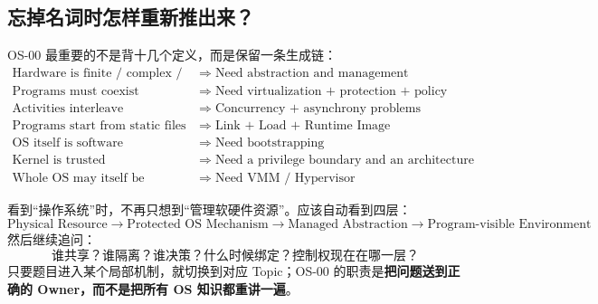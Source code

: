 \documentclass[11pt,a4paper]{ctexart}
\newcommand{\kw}[1]{\textbf{#1}}
\begin{document}
\subsection{忘掉名词时怎样重新推出来？}

OS-00 最重要的不是背十几个定义，而是保留一条生成链：
\[
\boxed{
\begin{aligned}
\text{Hardware is finite / complex / shared}\;&\Rightarrow\;\text{Need abstraction and management}\\
\text{Programs must coexist}\;&\Rightarrow\;\text{Need virtualization + protection + policy}\\
\text{Activities interleave}\;&\Rightarrow\;\text{Concurrency + asynchrony problems}\\
\text{Programs start from static files}\;&\Rightarrow\;\text{Link + Load + Runtime Image}\\
\text{OS itself is software}\;&\Rightarrow\;\text{Need bootstrapping}\\
\text{Kernel is trusted}\;&\Rightarrow\;\text{Need a privilege boundary and an architecture choice}\\
\text{Whole OS may itself be virtualized}\;&\Rightarrow\;\text{Need VMM / Hypervisor}
\end{aligned}
}
\]

\begin{corebox}[本册最终心智模型]
看到“操作系统”时，不再只想到“管理软硬件资源”。应该自动看到四层：
\[
\boxed{
\text{Physical Resource}
\rightarrow
\text{Protected OS Mechanism}
\rightarrow
\text{Managed Abstraction}
\rightarrow
\text{Program-visible Environment}
}
\]
然后继续追问：
\[
\boxed{\text{谁共享？谁隔离？谁决策？什么时候绑定？控制权现在在哪一层？}}
\]
只要题目进入某个局部机制，就切换到对应 Topic；OS-00 的职责是\kw{把问题送到正确的 Owner，而不是把所有 OS 知识都重讲一遍}。
\end{corebox}
\end{document}
